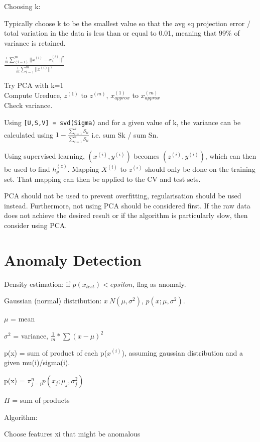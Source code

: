 \documentclass[12pt] {article}
\begin{document}
{  Choosing k:

  Typically choose k to be the smallest value so that the avg sq projection
  error / total variation in the data is less than or equal to 0.01, meaning
  that 99\% of variance is retained. 

  $\frac{\frac{1}{m} \sum_{(i=1)}^m ||x^{(i)} - x_{\approx}^{(i)}||^2} 
  {\frac{1}{m} \sum_{i=1}^m ||x^{(i)}||^2}$

  Try PCA with k=1\\Compute Ureduce, $z^{(1)}$ to $z^{(m)}$, $x_{approx}^{(1)}$ 
  to $x_{approx}^{(m)}$\\Check variance. 

  Using \texttt{[U,S,V] = svd(Sigma)} and for a given value of k, the variance
  can be calculated using $1-\frac{\sum_{i=1}^k S_{ii}}{\sum_{i=1}^n S_{ii}}$ 
  i.e. sum Sk / sum Sn.

  Using supervised learning, $(x^{(i)},y^{(i)})$ becomes $(z^{(i)},y^{(i)})$, 
  which can then be used to find $h_\theta^{(z)}$. Mapping $X^{(i)}$ to 
  $z^{(i)}$ should only be done on the training set. That mapping can then be 
  applied to the CV and test sets. 

  PCA should not be used to prevent overfitting, regularisation should be used
  instead. Furthermore, not using PCA should be considered first. If the raw
  data does not achieve the desired result or if the algorithm is particularly
  slow, then consider using PCA. 

  \newpage

\section{Anomaly Detection}

  Density estimation: if $p(x_{test}) < epsilon$, flag as anomaly. 

  Gaussian (normal) distribution: $x~N(\mu,\sigma^2)$, $p(x;\mu,\sigma^2)$.

  $\mu$ = mean
  
  $\sigma^2$ = variance, $\frac{1}{m} * \sum(x - \mu)^2$

  p(x) = sum of product of each p($x^{(i)}$), assuming gaussian distribution and
  a given mu(i)/sigma(i). 

  p(x) = $\pi_{j=i}^n p(x_j;\mu_j, \sigma_j^2)$

  $\Pi$ = sum of products

  Algorithm:

  Choose features xi that might be anomalous

}
\end{document}
